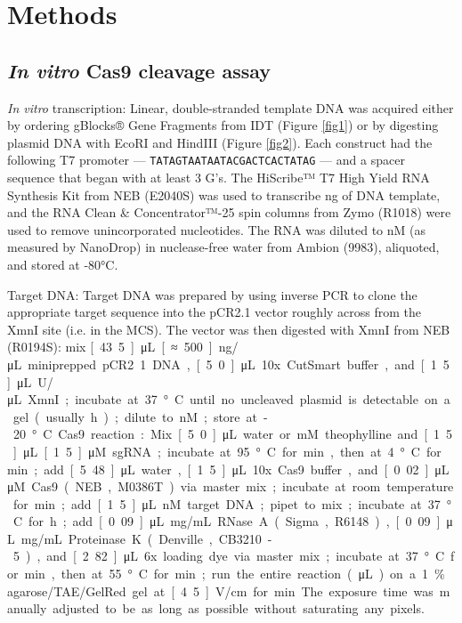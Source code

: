 \documentclass[twocolumn]{article}
\newcommand\captitle{\textit}
\newcommand\reffig[1]{Figure \ref{#1}}
\newcommand\seq[1]{\texttt{#1}}
\newcommand\latin[1]{\emph{#1}}
\newcommand\hr[1]{\unit[#1]{h}}
\newcommand\mgml[1]{\unit[#1]{mg/mL}}
\newcommand\minx[1]{\unit[#1]{min}}
\newcommand\mm[1]{\unit[#1]{mM}}
\newcommand\ngx[1]{\unit[#1]{ng}}
\newcommand\ngul[1]{\unit[#1]{ng/μL}}
\newcommand\nm[1]{\unit[#1]{nM}}
\newcommand\ul[1]{\unit[#1]{μL}}
\newcommand\um[1]{\unit[#1]{μM}}
\newcommand\uul[1]{\unit[#1]{U/μL}}
\newcommand\vcm[1]{\unit[#1]{V/cm}}
\begin{document}
\begin{table}
 \centering
 \resizebox{\columnwidth}{!}{}
 \caption{
  \captitle{Summary of rational design results.}  The results are organized by 
  the design strategy we employed and the domain the sgrNA was inserted into.  
  We tested 97 designs and found 10 that were active, including at least one 
  active design for each domain.  We considered a design active if it exhibited 
  a >15%
  at which the difference is clearly visible on a gel.
 }
 \label{tab1}
\end{table}

\section{Methods}

\subsection{\latin{In vitro} Cas9 cleavage assay}

\latin{In vitro} transcription: Linear, double-stranded template DNA was 
acquired either by ordering gBlocks® Gene Fragments from IDT (\reffig{fig1}) or 
by digesting plasmid DNA with EcoRI and HindIII (\reffig{fig2}).  Each 
construct had the following T7 promoter --- \seq{TATAGTAATAATACGACTCACTATAG} 
--- and a spacer sequence that began with at least 3 G's.  The HiScribe™ T7 
High Yield RNA Synthesis Kit from NEB (E2040S) was used to transcribe 
\ngx{10-50} of DNA template, and the RNA Clean \& Concentrator™-25 spin columns 
from Zymo (R1018) were used to remove unincorporated nucleotides.  The RNA was 
diluted to \nm{1500} (as measured by NanoDrop) in nuclease-free water from 
Ambion (9983), aliquoted, and stored at -80°C.  

Target DNA: Target DNA was prepared by using inverse PCR to clone the 
appropriate target sequence into the pCR2.1 vector roughly across from the XmnI 
site (i.e. in the MCS).  The vector was then digested with XmnI from NEB 
(R0194S): mix \ul{43.5} \ngul{≈500} miniprepped pCR2.1 DNA, \ul{5.0} 10x 
CutSmart buffer, and \ul{1.5} \uul{20} XmnI; incubate at 37°C until no 
uncleaved plasmid is detectable on a gel (usually \hr{1-2}); dilute to \nm{30}; 
store at -20°C.  

Cas9 reaction: Mix \ul{5.0} water or \mm{30} theophylline and \ul{1.5} \um{1.5}
sgRNA; incubate at 95°C for \minx{3}, then at 4°C for \minx{1}; add \ul{5.48} 
water, \ul{1.5} 10x Cas9 buffer, and \ul{0.02} \um{20} Cas9 (NEB, M0386T) via 
master mix; incubate at room temperature for \minx{10}; add \ul{1.5} \nm{30} 
target DNA; pipet to mix; incubate at 37°C for \hr{1}; add \ul{0.09} \mgml{20} 
RNase~A (Sigma, R6148), \ul{0.09} \mgml{20} Proteinase~K (Denville, CB3210-5), 
and \ul{2.82} 6x loading dye via master mix; incubate at 37°C for \minx{20}, 
then at 55°C for \minx{20}; run the entire reaction (\ul{18}) on a 1\% 
agarose/TAE/GelRed gel at \vcm{4.5} for \minx{70}.  The exposure time was 
manually adjusted to be as long as possible without saturating any pixels.
\end{document}
